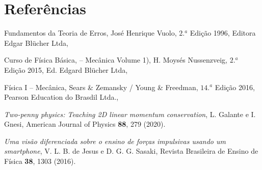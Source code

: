 \chapter{Referências}
\vspace{-0.7cm}

\begin{thebibliography}{9}
 Fundamentos da Teoria de Erros,  José Henrique Vuolo,  $2.^a$ Edição 1996, Editora Edgar Blücher Ltda,

 Curso de Física Básica,  – Mecânica Volume 1), H. Moysés Nussenzveig, $2.^a$ Edição 2015, Ed. Edgard Blücher Ltda,

 Física I – Mecânica, Sears \& Zemansky / Young \& Freedman, $14.^a$ Edição 2016, Pearson Education do Brasdil Ltda., 

{\it Two-penny physics: Teaching 2D linear momentum conservation}, 
L. Galante e I. Gnesi, 
American Journal of Physics {\bf88}, 279  (2020).

{\it Uma visão diferenciada sobre o ensino de forças impulsivas
usando um smartphone}, 
V. L. B. de Jesus e D. G. G. Sasaki, 
Revista Brasileira de Ensino de Física {\bf38}, 1303  (2016).
\end{thebibliography}

